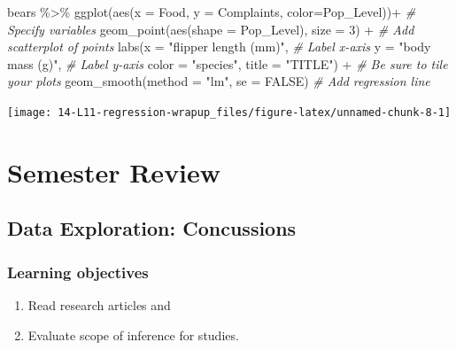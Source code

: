 \documentclass[
]{report}
\newenvironment{Shaded}{\begin{snugshade}}{\end{snugshade}}
\newcommand{\AttributeTok}[1]{\textcolor[rgb]{0.77,0.63,0.00}{#1}}
\newcommand{\CommentTok}[1]{\textcolor[rgb]{0.56,0.35,0.01}{\textit{#1}}}
\newcommand{\ConstantTok}[1]{\textcolor[rgb]{0.00,0.00,0.00}{#1}}
\newcommand{\DecValTok}[1]{\textcolor[rgb]{0.00,0.00,0.81}{#1}}
\newcommand{\FunctionTok}[1]{\textcolor[rgb]{0.00,0.00,0.00}{#1}}
\newcommand{\NormalTok}[1]{#1}
\newcommand{\SpecialCharTok}[1]{\textcolor[rgb]{0.00,0.00,0.00}{#1}}
\newcommand{\StringTok}[1]{\textcolor[rgb]{0.31,0.60,0.02}{#1}}
\begin{document}
\begin{Shaded}
\begin{Highlighting}[]
\NormalTok{bears }\SpecialCharTok{\%\textgreater{}\%}
  \FunctionTok{ggplot}\NormalTok{(}\FunctionTok{aes}\NormalTok{(}\AttributeTok{x =}\NormalTok{ Food, }\AttributeTok{y =}\NormalTok{ Complaints, }\AttributeTok{color=}\NormalTok{Pop\_Level))}\SpecialCharTok{+}  \CommentTok{\# Specify variables}
  \FunctionTok{geom\_point}\NormalTok{(}\FunctionTok{aes}\NormalTok{(}\AttributeTok{shape =}\NormalTok{ Pop\_Level), }\AttributeTok{size =} \DecValTok{3}\NormalTok{) }\SpecialCharTok{+}  \CommentTok{\# Add scatterplot of points}
  \FunctionTok{labs}\NormalTok{(}\AttributeTok{x =} \StringTok{"flipper length (mm)"}\NormalTok{,  }\CommentTok{\# Label x{-}axis}
       \AttributeTok{y =} \StringTok{"body mass (g)"}\NormalTok{,  }\CommentTok{\# Label y{-}axis}
       \AttributeTok{color =} \StringTok{"species"}\NormalTok{,}
       \AttributeTok{title =} \StringTok{"TITLE"}\NormalTok{) }\SpecialCharTok{+} \CommentTok{\# Be sure to tile your plots}
  \FunctionTok{geom\_smooth}\NormalTok{(}\AttributeTok{method =} \StringTok{"lm"}\NormalTok{, }\AttributeTok{se =} \ConstantTok{FALSE}\NormalTok{)  }\CommentTok{\# Add regression line}
\end{Highlighting}
\end{Shaded}

\begin{center}\texttt{[image: 14-L11-regression-wrapup\_files/figure-latex/unnamed-chunk-8-1]} \end{center}

\hypertarget{semester-review}{%
\chapter{Semester Review}\label{semester-review}}


\hypertarget{data-exploration-concussions}{%
\section{Data Exploration: Concussions}\label{data-exploration-concussions}}

\hypertarget{learning-objectives-23}{%
\subsection{Learning objectives}\label{learning-objectives-23}}

\begin{enumerate}
\def\labelenumi{\arabic{enumi}.}
\item
  Read research articles and
\item
  Evaluate scope of inference for studies.
\end{enumerate}
\end{document}
